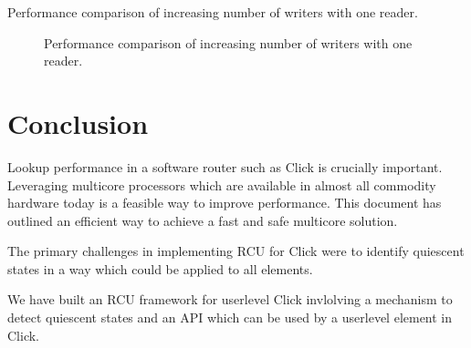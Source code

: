 \documentclass[a4paper,marginparwidth=50pt,marginparsep=10pt]{article}
\begin{document}
\begin{table}[tph]
\begin{center}

\end{center}
\label{tbl:micro_1r_vw}
\caption{Performance comparison of increasing number of writers with one reader.}
\end{table}

\begin{figure}[tph]
\begin{center}
\caption{Performance comparison of increasing number of writers with one reader.}
\label{img:micro_1r_vw}
\end{center}
\end{figure}


\section{Conclusion}
Lookup performance in a software router such as Click is crucially
important. Leveraging multicore processors which are available in almost all commodity hardware
today is a feasible way to improve performance. This document has outlined an efficient way to achieve a fast and safe multicore solution.


The primary challenges in implementing RCU for Click were to
identify quiescent states in a way which could be applied to all
elements. 

We have built an RCU framework for userlevel Click invlolving a
mechanism to detect quiescent states and an API which can be used by
a userlevel element in Click.
\end{document}

